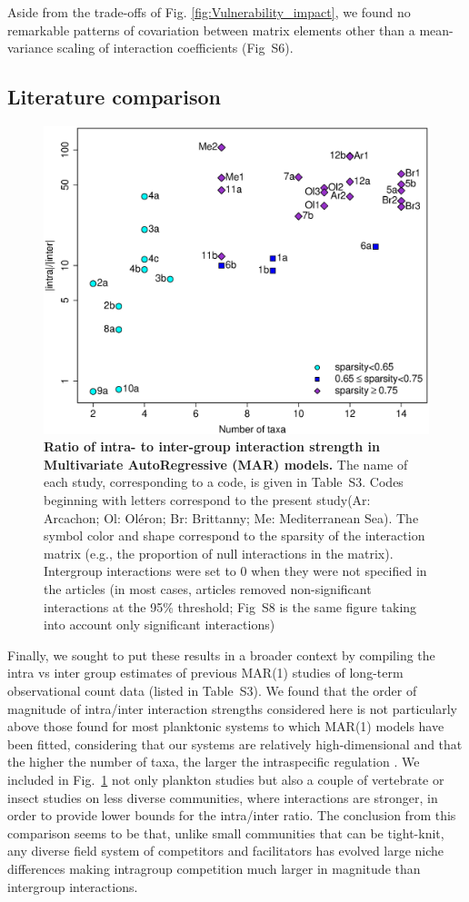 \documentclass[10pt]{article}
\begin{document}
Aside from the trade-offs of Fig. \ref{fig:Vulnerability_impact},
we found no remarkable patterns of covariation between matrix elements
other than a mean-variance scaling of interaction coefficients (Fig~S6).

\subsection*{Literature comparison}

\begin{figure}[!h]
\centering \includegraphics[width=0.8\linewidth]{Ratio_function_dim}
\caption{\textbf{Ratio of intra- to inter-group interaction strength in Multivariate
AutoRegressive (MAR) models.} The name of each study,
corresponding to a code, is given in Table~S3. Codes beginning
with letters correspond to the present study(Ar: Arcachon; Ol: Oléron; Br: Brittanny; Me: Mediterranean Sea). The symbol color and
shape correspond to the sparsity of the interaction matrix (e.g.,
the proportion of null interactions in the matrix). Intergroup interactions
were set to 0 when they were not specified in the articles (in most
cases, articles removed non-significant interactions at the 95\% threshold;
Fig~S8 is the same figure taking into account only significant interactions)}
\label{fig:meta_ratio} 
\end{figure}

Finally, we sought to put these results in a broader context by compiling
the intra vs inter group estimates of previous MAR(1) studies of long-term
observational count data (listed in Table~S3). We found that the
order of magnitude of intra/inter interaction strengths considered
here is not particularly above those found for most planktonic systems
to which MAR(1) models have been fitted, considering that our systems
are relatively high-dimensional and that the higher the number of
taxa, the larger the intraspecific regulation \citep{barabas_self-regulation_2017}.
We included in Fig.~\ref{fig:meta_ratio} not only plankton studies
but also a couple of vertebrate or insect studies on less diverse
communities, where interactions are stronger, in order to provide lower bounds for the intra/inter ratio. The conclusion from
this comparison seems to be that, unlike small communities that can
be tight-knit, any diverse field system of competitors and facilitators
has evolved large niche differences making intragroup competition
much larger in magnitude than intergroup interactions.
\end{document}
